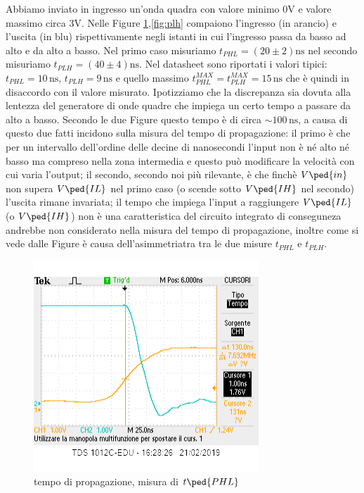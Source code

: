 \documentclass[10pt,a4paper]{article}
\begin{document}
Abbiamo inviato in ingresso un'onda quadra con valore minimo $0 \si{\volt}$  e valore massimo circa $3 \si{\volt}$. Nelle Figure \ref{fig:phl},\ref{fig:plh}  compaiono l'ingresso (in arancio) e l'uscita (in blu) rispettivamente negli istanti in cui l'ingresso passa da basso ad alto e da alto a basso.
Nel primo caso misuriamo $t_{PHL}= (20\pm 2 )\si{\nano\second}$ nel secondo  misuriamo $t_{PLH} = (40\pm 4)\si{\nano \second}$.
Nel datasheet sono riportati i valori tipici: $t_{PHL}= 10 \,\si{\nano\second}$, $t_{PLH} = 9\,\si{\nano \second}$ e quello massimo $t_{PHL}^{MAX}= t_{PLH}^{MAX}= 15\, \si{\nano\second}$ che è quindi in disaccordo con il valore misurato. Ipotizziamo  che la discrepanza sia dovuta alla lentezza del generatore di onde quadre che impiega un certo tempo a passare da alto a basso.
Secondo le due Figure questo tempo è di circa $\sim 100 \, \si {\nano\second}$, a causa di questo due fatti incidono sulla misura del tempo di propagazione: il primo è che per un intervallo dell'ordine delle decine di nanosecondi l'input non è né alto né basso ma compreso nella zona intermedia e questo può modificare la velocità con cui varia l'output; il secondo, secondo noi più rilevante, è che finchè $V\ped{in}$ non supera $V\ped{IL}$ nel primo caso (o scende sotto $V\ped{IH}$ nel secondo) l'uscita rimane invariata; il  tempo che  impiega l'input a raggiungere $V\ped{IL}$ (o  $V\ped{IH}$) non è una caratteristica del circuito integrato di conseguneza andrebbe non considerato nella misura del tempo di propagazione, inoltre come si vede dalle Figure è causa  dell'asimmetriatra tra le due misure  $t_{PHL}$ e  $t_{PLH}$.
\begin{figure}[h]
			\centering
			\includegraphics[scale=0.85]{schifo1}
			\caption{tempo di propagazione, misura di $t\ped{PHL}$}
			\label{fig:phl}
\end{figure}
\end{document}
